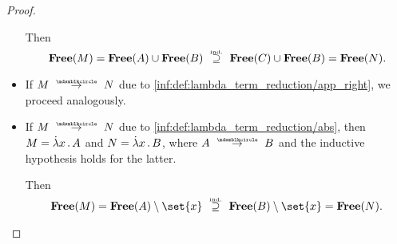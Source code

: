 \begin{proof}
\begin{itemize}
    Then
    \begin{equation*}
      \op*{Free}(M)
      =
      \op*{Free}(A) \cup \op*{Free}(B)
      \reloset {\T{ind.}} \supseteq
      \op*{Free}(C) \cup \op*{Free}(B)
      =
      \op*{Free}(N).
    \end{equation*}

    \item If \( M \pred N \) due to \ref{inf:def:lambda_term_reduction/app_right}, we proceed analogously.

    \item If \( M \pred N \) due to \ref{inf:def:lambda_term_reduction/abs}, then \( M = \qabs x A \) and \( N = \qabs x B \), where \( A \pred B \) and the inductive hypothesis holds for the latter.

    Then
    \begin{equation*}
      \op*{Free}(M)
      =
      \op*{Free}(A) \setminus \set{ x }
      \reloset {\T{ind.}} \supseteq
      \op*{Free}(B) \setminus \set{ x }
      =
      \op*{Free}(N).
    \end{equation*}
  \end{itemize}
\end{proof}

